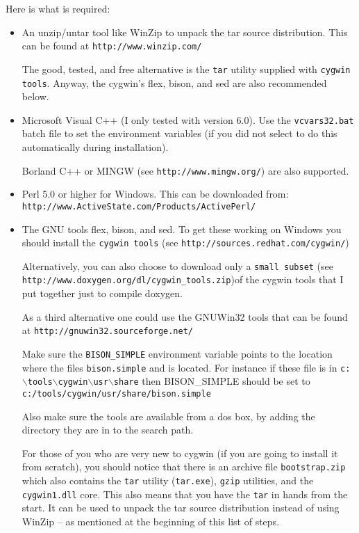 Here is what is required: \begin{itemize}
\item An unzip/untar tool like Win\-Zip to unpack the tar source distribution. This can be found at {\tt http://www.winzip.com/}

The good, tested, and free alternative is the {\tt tar} utility supplied with {\tt cygwin tools}. Anyway, the cygwin's flex, bison, and sed are also recommended below.

\item Microsoft Visual C++ (I only tested with version 6.0). Use the {\tt vcvars32.bat} batch file to set the environment variables (if you did not select to do this automatically during installation).

Borland C++ or MINGW (see {\tt http://www.mingw.org/}) are also supported.

\item Perl 5.0 or higher for Windows. This can be downloaded from: {\tt http://www.Active\-State.com/Products/Active\-Perl/}

\item The GNU tools flex, bison, and sed. To get these working on Windows you should install the {\tt cygwin tools} (see {\tt http://sources.redhat.com/cygwin/})

Alternatively, you can also choose to download only a {\tt small subset} (see {\tt http://www.doxygen.org/dl/cygwin\_tools.zip})of the cygwin tools that I put together just to compile doxygen.

As a third alternative one could use the GNUWin32 tools that can be found at {\tt http://gnuwin32.sourceforge.net/}

Make sure the {\tt BISON\_\-SIMPLE} environment variable points to the location where the files {\tt bison.simple} and is located. For instance if these file is in {\tt c:$\backslash$tools$\backslash$cygwin$\backslash$usr$\backslash$share} then BISON\_\-SIMPLE should be set to {\tt c:/tools/cygwin/usr/share/bison.simple}

Also make sure the tools are available from a dos box, by adding the directory they are in to the search path.

For those of you who are very new to cygwin (if you are going to install it from scratch), you should notice that there is an archive file {\tt bootstrap.zip} which also contains the {\tt tar} utility ({\tt tar.exe}), {\tt gzip} utilities, and the {\tt cygwin1.dll} core. This also means that you have the {\tt tar} in hands from the start. It can be used to unpack the tar source distribution instead of using Win\-Zip -- as mentioned at the beginning of this list of steps.


\end{itemize}
